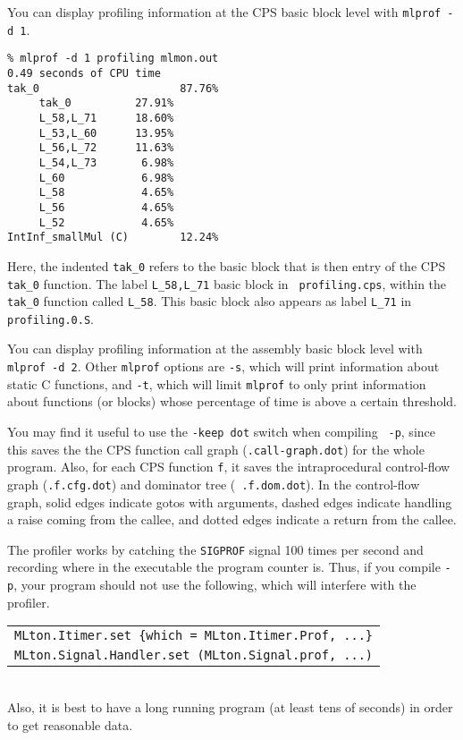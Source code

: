 You can display profiling information at the CPS basic block level with
{\tt mlprof -d 1}.

\begin{verbatim}
% mlprof -d 1 profiling mlmon.out
0.49 seconds of CPU time
tak_0                      87.76%
     tak_0          27.91%       
     L_58,L_71      18.60%       
     L_53,L_60      13.95%       
     L_56,L_72      11.63%       
     L_54,L_73       6.98%       
     L_60            6.98%       
     L_58            4.65%       
     L_56            4.65%       
     L_52            4.65%       
IntInf_smallMul (C)        12.24%
\end{verbatim}
Here, the indented {\tt tak\_0} refers to the basic block that is then entry of
the CPS {\tt tak\_0} function.  The label {\tt L\_58,L\_71} basic block in {\tt
profiling.cps}, within the {\tt tak\_0} function called {\tt L\_58}.  This basic
block also appears as label {\tt L\_71} in {\tt profiling.0.S}.

You can display profiling information at the assembly basic block level with
{\tt mlprof -d 2}.  Other {\tt mlprof} options are
{\tt -s}, which will print information about static C functions, and {\tt -t},
which will limit {\tt mlprof} to only print information about functions (or
blocks) whose percentage of time is above a certain threshold.

You may find it useful to use the {\tt -keep dot} switch when compiling {\tt
-p}, since this saves the the CPS function call graph ({\tt .call-graph.dot})
for the whole program.  Also, for each CPS function {\tt f}, it saves the
intraprocedural control-flow graph ({\tt .f.cfg.dot}) and dominator tree ({\tt
.f.dom.dot}).  In the control-flow graph, solid edges indicate gotos with
arguments, dashed edges indicate handling a raise coming from the callee, and
dotted edges indicate a return from the callee.

The profiler works by catching the {\tt SIGPROF} signal 100 times per second and
recording where in the executable the program counter is.  Thus, if you compile
{\tt -p}, your program should not use the following, which will interfere with
the profiler.\\
\begin{tabular}{l}
\tt MLton.Itimer.set \{which = MLton.Itimer.Prof, ...\}\\
\tt MLton.Signal.Handler.set (MLton.Signal.prof, ...)
\end{tabular}\\
Also, it is best to have a long running program (at least tens of seconds) in
order to get reasonable data. 

